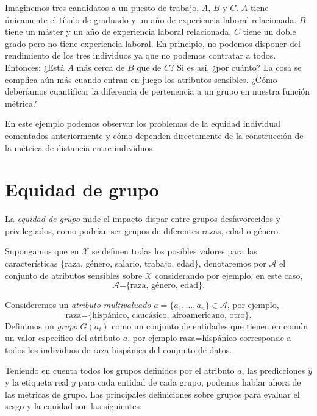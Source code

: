 \documentclass[oneside,openright,titlepage,numbers=noenddot,openany,headinclude,footinclude=true,
cleardoublepage=empty,abstractoff,BCOR=5mm,paper=a4,fontsize=12pt,main=spanish]{scrreprt}
\begin{document}
\begin{example}
Imaginemos tres candidatos a un puesto de trabajo, $A$, $B$ y $C$. $A$ tiene únicamente el título de graduado y un año de experiencia laboral relacionada. $B$ tiene un máster y un año de experiencia laboral relacionada. $C$ tiene un doble grado pero no tiene experiencia laboral. En principio, no podemos disponer del rendimiento de los tres individuos ya que no podemos contratar a todos. Entonces: ¿Está $A$ más cerca de $B$ que de $C$? Si es así, ¿por cuánto? La cosa se complica aún más cuando entran en juego los atributos sensibles. ¿Cómo deberíamos cuantificar la diferencia de pertenencia a un grupo en nuestra función métrica?

En este ejemplo podemos observar los problemas de la equidad individual comentados anteriormente y cómo dependen directamente de la construcción de la métrica de distancia entre individuos.
\end{example}

\section{Equidad de grupo} 
\label{sec:groupmetrics}

La \textit{equidad de grupo} mide el impacto dispar entre grupos desfavorecidos y privilegiados, como podrían ser grupos de diferentes razas, edad o género.

Supongamos que en $\mathcal{X}$ se definen todas los posibles valores para las características \{raza, género, salario, trabajo, edad\}, denotaremos por $\mathcal{A}$ el conjunto de atributos sensibles sobre $\mathcal{X}$ considerando por ejemplo, en este caso, $$\mathcal{A}\text{=\{raza, género, edad\}}.$$

Consideremos un \textit{atributo multivaluado} $a = \{a_1,\dots,a_n\} \in \mathcal{A}$, por ejemplo, $$\text{raza=\{hispánico, caucásico, afroamericano, otro\}}.$$ Definimos un \textit{grupo} $G(a_i)$
como un conjunto de entidades que tienen en común un valor específico
del atributo $a$, por ejemplo raza=hispánico corresponde a todos los individuos de raza hispánica del
conjunto de datos.

Teniendo en cuenta todos los grupos definidos por el atributo $a$, las predicciones $\hat{y}$ y la etiqueta real $y$ para cada entidad de cada grupo, podemos hablar
ahora de las métricas de grupo. Las principales definiciones sobre grupos para
evaluar el sesgo y la equidad son las siguientes:
\end{document}

